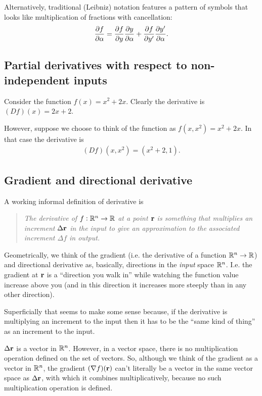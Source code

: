 Alternatively, traditional (Leibniz) notation features a pattern of symbols that looks like
multiplication of fractions with cancellation:
\begin{align*}
  \frac{\partial f}{\partial \alpha} = \frac{\partial f}{\partial y} \frac{\partial y}{\partial \alpha} + \frac{\partial f}{\partial y'}\frac{\partial y'}{\partial \alpha}.
\end{align*}



\subsection{Partial derivatives with respect to non-independent inputs}

Consider the function $f(x) = x^2 + 2x$. Clearly the derivative is $(D f)(x) = 2x + 2$.

However, suppose we choose to think of the function as $f(x, x^2) = x^2 + 2x$. In that case the
derivative is
\begin{align*}
  (D f)(x, x^2) = (x^2 + 2, 1).
\end{align*}



\subsection{Gradient and directional derivative}
\newpage
A working informal definition of derivative is
\begin{quote}
  \emph{
    The derivative of $f:\mathbb{R}^n \to \mathbb{R}$ at a point $\mathbf{r}$ is something that multiplies an increment
    $\Delta \mathbf{r}$ in the input to give an approximation to the associated increment $\Delta f$ in output.
  }
\end{quote}

Geometrically, we think of the gradient (i.e. the derivative of a function $\mathbb{R}^n \to \mathbb{R}$) and
directional derivative as, basically, directions in the \emph{input} space $\mathbb{R}^n$. I.e. the gradient
at $\mathbf{r}$ is a ``direction you walk in'' while watching the function value increase above you (and in
this direction it increases more steeply than in any other direction).

Superficially that seems to make some sense because, if the derivative is multiplying an increment
to the input then it has to be the ``same kind of thing'' as an increment to the input.

$\Delta \mathbf{r}$ is a vector in $\mathbb{R}^n$. However, in a vector space, there is no multiplication operation defined
on the set of vectors. So, although we think of the gradient as a vector in $\mathbb{R}^n$, the gradient
$(\nabla f)(\mathbf{r})$ can't literally be a vector in the same vector space as $\Delta \mathbf{r}$, with which it combines
multiplicatively, because no such multiplication operation is defined.

